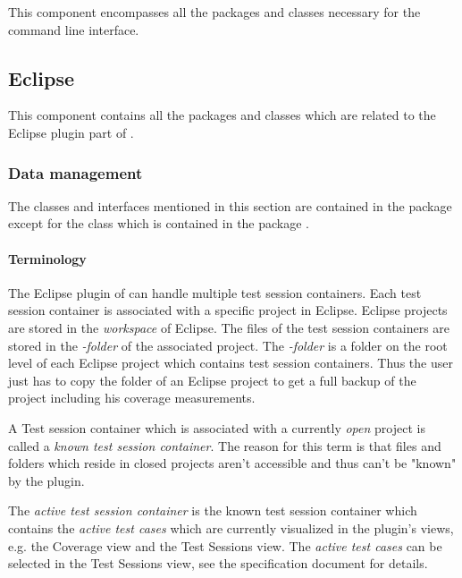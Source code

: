 This component encompasses all the packages and classes necessary for the command line interface.

\subsection{Eclipse}

\def\extpoint#1{
\code{\texorpdfstring{\url{org.eclipse.#1}}{org.eclipse.#1}}
}

This component contains all the packages and classes which are related to the Eclipse plugin part of \gbt.


\subsubsection{Data management}

The classes and interfaces mentioned in this section are contained in the package  except for the class  which is contained in the package .

\paragraph{Terminology}

The Eclipse plugin of \gbt can handle multiple test session containers. Each test session container is associated with a specific project in Eclipse. Eclipse projects are stored in the \emph{workspace} of Eclipse. The files of the test session containers are stored in the \emph{\gbt-folder} of the associated project. The \emph{\gbt-folder} is a folder on the root level of each Eclipse project which contains test session containers. Thus the user just has to copy the folder of an Eclipse project to get a full backup of the project including his coverage measurements.

A Test session container which is associated with a currently \emph{open} project is called a \emph{known test session container}. The reason for this term is that files and folders which reside in closed projects aren't accessible and thus can't be "known" by the plugin.

The \emph{active test session container} is the known test session container which contains the \emph{active test cases} which are currently visualized in the plugin's views, e.g. the Coverage view and the Test Sessions view. The \emph{active test cases} can be selected in the Test Sessions view, see the specification document for details.


